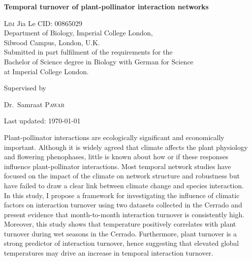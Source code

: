 \documentclass[11pt]{article}
\renewenvironment{abstract}
 {\hspace{.8cm}
  {\bfseries\huge\abstractname}
  \list{}{
    \setlength{\leftmargin}{.95cm}%
    \setlength{\rightmargin}{\leftmargin}%
  }%
  \item\relax}
 {\endlist}
\begin{document}
\begin{titlepage}
	\centering
	\vspace*{\fill}
	{\huge\bfseries Temporal turnover of plant-pollinator interaction networks \par}
	\vspace{2cm}
	{\Large \textsc{Lim} Jia Le  {    }  CID: 00865029}
	\\ 	\vspace{0.5cm}
	{Department of Biology, Imperial College London, \\Silwood Campus, London, U.K.} \\ \vspace{0.5cm}
	{Submitted in part fulfilment of the requirements for the \\ Bachelor of Science degree in Biology with German for Science \\ at Imperial College London.} \\
	\vspace*{\fill}
	{\large Supervised by\par
	Dr.~Samraat \textsc{Pawar}}
	\vfill
	{\large Last updated: \today\par}
\end{titlepage}

\newpage
{}
\vspace*{\fill}
\begin{abstract}  %
\doublespacing
Plant-pollinator interactions are ecologically significant and economically important. Although it is widely agreed that climate affects the plant physiology and flowering phenophases, little is known about how or if these responses influence plant-pollinator interactions. Most temporal network studies have focused on the impact of the climate on network structure and robustness but have failed to draw a clear link between climate change and species interaction. In this study, I propose a framework for investigating the influence of climatic factors on interaction turnover using two datasets collected in the Cerrado and present evidence that month-to-month interaction turnover is consistently high. Moreover, this study shows that temperature positively correlates with plant turnover during wet seasons in the Cerrado. Furthermore, plant turnover is a strong predictor of interaction turnover, hence suggesting that elevated global temperatures may drive an increase in temporal interaction turnover. 
\end{abstract}
\vfill
\end{document}
